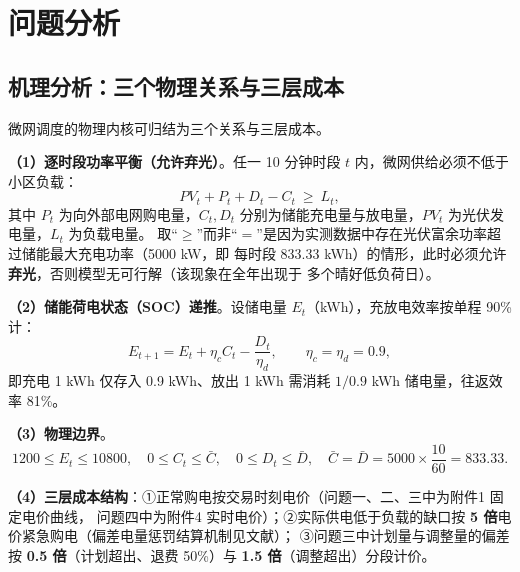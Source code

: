 \section{问题分析}

\subsection{机理分析\nobreak：三个物理关系与三层成本}

微网调度的物理内核可归结为三个关系与三层成本\cite{ieee_tou,thu_ess}\nobreak。

\textbf{（1\nobreak）逐时段功率平衡（允许弃光\nobreak）}\nobreak。任一 10 分钟时段 $t$ 内\nobreak，微网供给必须不低于小区负载\nobreak：
\begin{equation}
PV_t + P_t + D_t - C_t \ \ge\ L_t ,
\label{eq:balance_general}
\end{equation}
其中 $P_t$ 为向外部电网购电量\nobreak，$C_t,D_t$ 分别为储能充电量与放电量\nobreak，$PV_t$ 为光伏发电量\nobreak，$L_t$ 为负载电量\nobreak。
取“$\ge$\nobreak”而非“$=$\nobreak”是因为实测数据中存在光伏富余功率超过储能最大充电功率（5000 kW\nobreak，即
每时段 833.33 kWh\nobreak）的情形\nobreak，此时必须允许\textbf{弃光}\nobreak，否则模型无可行解（该现象在全年出现于
多个晴好低负荷日\nobreak）\nobreak。

\textbf{（2\nobreak）储能荷电状态（SOC\nobreak）递推}\nobreak。设储电量 $E_t$（kWh\nobreak）\nobreak，充放电效率按单程 90\% 计\nobreak：
\begin{equation}
E_{t+1} = E_t + \eta_c C_t - \frac{D_t}{\eta_d}, \qquad \eta_c=\eta_d=0.9 ,
\label{eq:soc}
\end{equation}
即充电 1 kWh 仅存入 0.9 kWh\nobreak、放出 1 kWh 需消耗 $1/0.9$ kWh 储电量\nobreak，往返效率 81\%\nobreak。

\textbf{（3\nobreak）物理边界}\nobreak。
\begin{equation}
1200 \le E_t \le 10800,\quad 0\le C_t \le \bar C,\quad 0\le D_t \le \bar D,\quad \bar C=\bar D=5000\times\frac{10}{60}=833.33 .
\label{eq:bounds}
\end{equation}

\textbf{（4\nobreak）三层成本结构}\nobreak：①正常购电按交易时刻电价（问题一\nobreak、二\nobreak、三中为附件1 固定电价曲线\nobreak，
问题四中为附件4 实时电价\nobreak）\nobreak；②实际供电低于负载的缺口按 \textbf{5 倍}电价紧急购电（偏差电量惩罚结算机制见文献\cite{cn111260354}\nobreak）\nobreak；
③问题三中计划量与调整量的偏差按 \textbf{0.5 倍}（计划超出\nobreak、退费 50\%\nobreak）与
\textbf{1.5 倍}（调整超出\nobreak）分段计价\nobreak。

